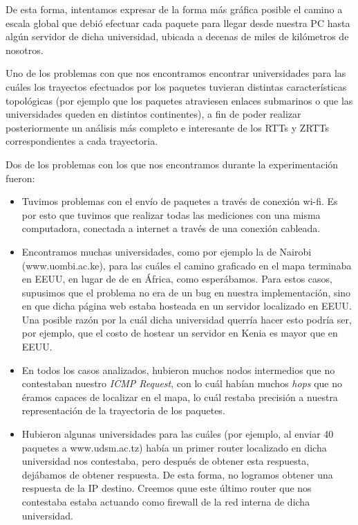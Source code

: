 \documentclass[final,inline,a4paper,narroweqnarray]{ieee}
\begin{document}
De esta forma, intentamos expresar de la forma más gráfica posible el camino a
escala global que debió efectuar cada paquete para llegar desde nuestra PC hasta
algún servidor de dicha universidad, ubicada a decenas de miles de kilómetros de
nosotros.

Uno de los problemas con que nos encontramos encontrar universidades para las
cuáles los trayectos efectuados por los paquetes tuvieran distintas
características topológicas (por ejemplo que los paquetes atraviesen enlaces
submarinos o que las universidades queden en distintos continentes), a fin de
poder realizar posteriormente un análisis más completo e interesante de los RTTs
y ZRTTs correspondientes a cada trayectoria.

Dos de los problemas con los que nos encontramos durante la experimentación
fueron:
\begin{itemize}

  \item Tuvimos problemas con el envío de paquetes a través de conexión wi-fi.
  Es por esto que tuvimos que realizar todas las mediciones con una misma
  computadora, conectada a internet a través de una conexión cableada.

  \item Encontramos muchas universidades, como por ejemplo la de Nairobi
  (www.uombi.ac.ke), para las cuáles el camino graficado en el mapa terminaba en
  EEUU, en lugar de de en África, como esperábamos. Para estos casos, supusimos
  que el problema no era de un bug en nuestra implementación, sino en que dicha
  página web estaba hosteada en un servidor localizado en EEUU. Una posible
  razón por la cuál dicha universidad querría hacer esto podría ser, por
  ejemplo, que el costo de hostear un servidor en Kenia es mayor que en EEUU.

  \item En todos los casos analizados, hubieron muchos nodos intermedios que no
  contestaban nuestro \emph{ICMP Request}, con lo cuál habían muchos \emph{hops}
  que no éramos capaces de localizar en el mapa, lo cuál restaba precisión a
  nuestra representación de la trayectoria de los paquetes.

  \item Hubieron algunas universidades para las cuáles (por ejemplo, al enviar
  40 paquetes a www.udsm.ac.tz) había un primer router localizado en dicha
  universidad nos contestaba, pero después de obtener esta respuesta, dejábamos
  de obtener respuesta. De esta forma, no logramos obtener una respuesta de la
  IP destino. Creemos quue este último router que nos contestaba estaba actuando
  como firewall de la red interna de dicha universidad.

\end{itemize}
\end{document}
